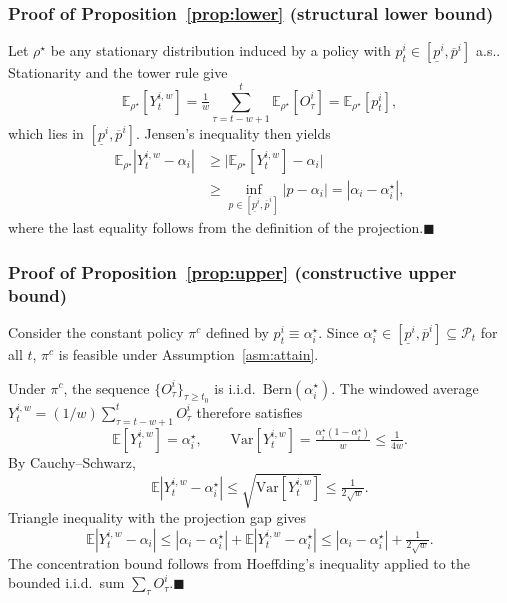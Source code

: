 \documentclass[a4paper,fleqn]{cas-dc}
\theoremstyle{plain}
\theoremstyle{remark}
\theoremstyle{plain}
\begin{document}
\subsubsection{Proof of Proposition~\ref{prop:lower} (structural lower bound)}

Let $\rho^\star$ be any stationary distribution induced by a policy with $p_t^i\in[\underline p^i,\overline p^i]$ a.s.. Stationarity and the tower rule give
\begin{equation*}
\mathbb{E}_{\rho^\star}[Y_t^{i,w}]
=\tfrac{1}{w}\sum_{\tau=t-w+1}^{t}\mathbb{E}_{\rho^\star}[O_\tau^i]
=\mathbb{E}_{\rho^\star}[p_t^i],
\end{equation*}
which lies in $[\underline p^i,\overline p^i]$. Jensen's inequality then yields
\begin{equation*}
\begin{aligned}\mathbb{E}_{\rho^\star}|Y_t^{i,w}-\alpha_i|
&\ge \big|\mathbb{E}_{\rho^\star}[Y_t^{i,w}]-\alpha_i\big|
\\ &\ge \inf_{p\in[\underline p^i,\overline p^i]}|p-\alpha_i|
= |\alpha_i-\alpha_i^\star|,\end{aligned}
\end{equation*}
where the last equality follows from the definition of the projection.\hfill$\blacksquare$

\subsubsection{Proof of Proposition~\ref{prop:upper} (constructive upper bound)}

Consider the constant policy $\pi^c$ defined by $p_t^i\equiv\alpha_i^\star$. Since $\alpha_i^\star\in[\underline p^i,\overline p^i]\subseteq\mathcal{P}_t$ for all $t$, $\pi^c$ is feasible under Assumption~\ref{asm:attain}.

Under $\pi^c$, the sequence $\{O_\tau^i\}_{\tau\ge t_0}$ is i.i.d.\ $\mathrm{Bern}(\alpha_i^\star)$. The windowed average $Y_t^{i,w}=(1/w)\sum_{\tau=t-w+1}^{t}O_\tau^i$ therefore satisfies
\begin{equation*}
\mathbb{E}[Y_t^{i,w}]=\alpha_i^\star,\qquad
\mathrm{Var}[Y_t^{i,w}]=\tfrac{\alpha_i^\star(1-\alpha_i^\star)}{w}\le\tfrac{1}{4w}.
\end{equation*}
By Cauchy--Schwarz,
\begin{equation*}
\mathbb{E}|Y_t^{i,w}-\alpha_i^\star|
\le \sqrt{\mathrm{Var}[Y_t^{i,w}]}
\le\tfrac{1}{2\sqrt{w}}.
\end{equation*}
Triangle inequality with the projection gap gives
\begin{equation*}
\mathbb{E}|Y_t^{i,w}-\alpha_i|
\le |\alpha_i-\alpha_i^\star|+\mathbb{E}|Y_t^{i,w}-\alpha_i^\star|
\le |\alpha_i-\alpha_i^\star|+\tfrac{1}{2\sqrt{w}}.
\end{equation*}
The concentration bound follows from Hoeffding's inequality applied to the bounded i.i.d.\ sum $\sum_{\tau}O_\tau^i$.\hfill$\blacksquare$
\end{document}
